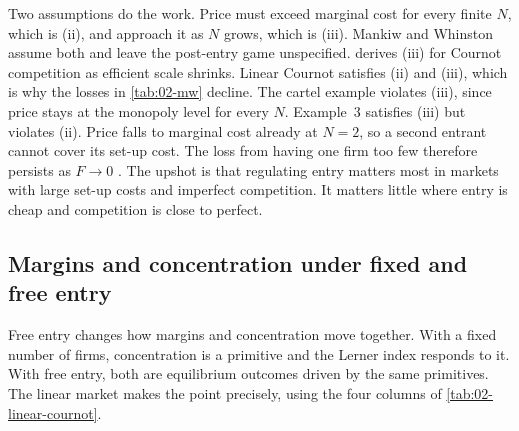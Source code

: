 Two assumptions do the work. Price must exceed marginal cost for every finite $N$, which is (ii), and approach it
as $N$ grows, which is (iii). Mankiw and Whinston assume both and leave the post-entry game unspecified.
\citet{Novshek1980} derives (iii) for Cournot competition as efficient scale shrinks. Linear Cournot satisfies
(ii) and (iii), which is why the losses in \cref{tab:02-mw} decline. The cartel example violates (iii), since price
stays at the monopoly level for every $N$. Example~3 satisfies (iii) but violates (ii). Price falls to marginal
cost already at $N = 2$, so a second entrant cannot cover its set-up cost. The loss from having one firm too few
therefore persists as $F \to 0$ \citep[p.~57]{MankiwWhinston1986}. The upshot is that regulating entry matters most in markets
with large set-up costs and imperfect competition. It matters little where entry is cheap and competition is close
to perfect.

\subsection{Margins and concentration under fixed and free entry}\label{sec:02-LH}

Free entry changes how margins and concentration move together. With a fixed number of firms, concentration is a
primitive and the Lerner index responds to it. With free entry, both are equilibrium outcomes driven by the same
primitives. The linear market makes the point precisely, using the four columns of \cref{tab:02-linear-cournot}.


